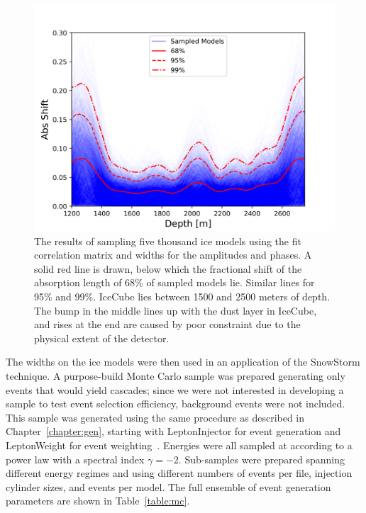 \documentclass[main.tex]{subfiles}
\begin{document}
\begin{figure}
    \centering
    \includegraphics[width=0.8\linewidth]{figures/icemodel_smooth.png}
    \caption{The results of sampling five thousand ice models using the fit correlation matrix and widths for the amplitudes and phases. A solid red line is drawn, below which the fractional shift of the absorption length of 68\% of sampled models lie. Similar lines for 95\% and 99\%. IceCube lies between 1500 and 2500 meters of depth. The bump in the middle lines up with the dust layer in IceCube, and rises at the end are caused by poor constraint due to the physical extent of the detector.}\label{fig:envelope}
\end{figure}

The widths on the ice models were then used in an application of the SnowStorm technique. 
A purpose-build Monte Carlo sample was prepared generating only events that would yield cascades; since we were not interested in developing a sample to test event selection efficiency, background events were not included. 
This sample was generated using the same procedure as described in Chapter~\ref{chapter:gen}, starting with LeptonInjector for event generation and LeptonWeight for event weighting~\cite{ABBASI2021108018}. 
Energies were all sampled at according to a power law with a spectral index $\gamma=-2$.
Sub-samples were prepared spanning different energy regimes and using different numbers of events per file, injection cylinder sizes, and events per model. 
The full ensemble of event generation parameters are shown in Table~\ref{table:mc}.
\end{document}
